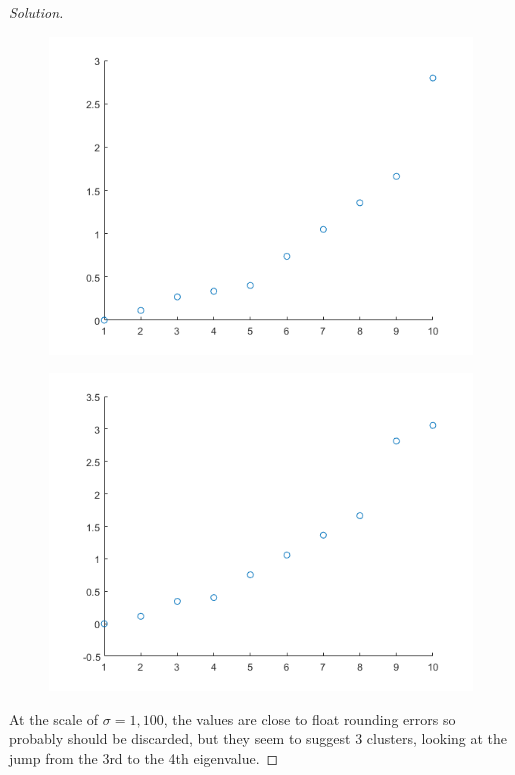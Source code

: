 \documentclass[10pt]{article}
\begin{document}
\begin{proof}[Solution]
\begin{figure}[H]
\centering
\begin{minipage}{.5\textwidth}
  \centering
  \includegraphics[width=\linewidth]{10000_sigma}
  \label{fig:test1}
\end{minipage}%
\begin{minipage}{.5\textwidth}
  \centering
  \includegraphics[width=\linewidth]{1000000_sigma}
  \label{fig:test2}
\end{minipage}
\end{figure}

At the scale of $\sigma =1, 100$, the values are close to float rounding errors so probably should be discarded, but they seem to suggest $3$ clusters, looking at the jump from the 3rd to the 4th eigenvalue.


\end{proof}
\end{document}
